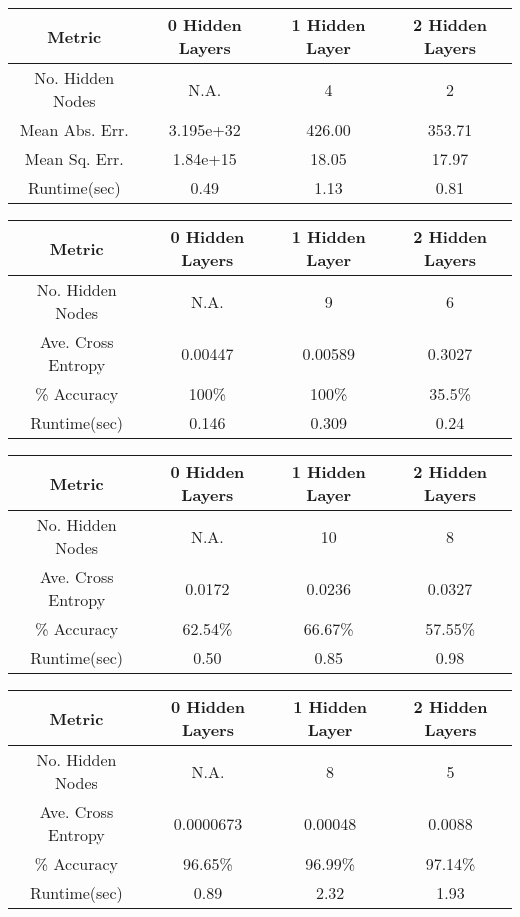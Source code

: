 \documentclass[twoside,11pt]{article}
\begin{document}
\begin{center}
	\begin{tabular}{|c c c c|}
		\hline
		Metric & 0 Hidden Layers & 1 Hidden Layer & 2 Hidden Layers \\ [0.5ex]
		\hline \hline
		No. Hidden Nodes & N.A. & 4 & 2 \\
		\hline
		Mean Abs. Err. & 3.195e+32 & 426.00 & 353.71 \\
		\hline
		Mean Sq. Err. & 1.84e+15 & 18.05 & 17.97 \\
		\hline
		Runtime(sec) & 0.49 & 1.13 &  0.81 \\
		\hline
	\end{tabular}
\end{center}


\begin{center}
	\begin{tabular}{|c c c c|}
		\hline
		Metric & 0 Hidden Layers & 1 Hidden Layer & 2 Hidden Layers \\ [0.5ex]
		\hline \hline
		No. Hidden Nodes & N.A. & 9 & 6 \\
		\hline
		Ave. Cross Entropy & 0.00447 & 0.00589 & 0.3027 \\
		\hline
		\% Accuracy & 100\% & 100\% & 35.5\% \\
		\hline
		Runtime(sec) & 0.146 & 0.309 & 0.24 \\
		\hline
	\end{tabular}
\end{center}


\begin{center}
	\begin{tabular}{|c c c c|}
		\hline
		Metric & 0 Hidden Layers & 1 Hidden Layer & 2 Hidden Layers \\ [0.5ex]
		\hline \hline
		No. Hidden Nodes & N.A. & 10 & 8 \\
		\hline
		Ave. Cross Entropy & 0.0172 & 0.0236 & 0.0327 \\
		\hline
		\% Accuracy & 62.54\% & 66.67\% & 57.55\% \\
		\hline
		Runtime(sec) & 0.50 & 0.85 & 0.98 \\
		\hline
	\end{tabular}
\end{center}

\begin{center}
	\begin{tabular}{|c c c c|}
		\hline
		Metric & 0 Hidden Layers & 1 Hidden Layer & 2 Hidden Layers \\ [0.5ex]
		\hline \hline
		No. Hidden Nodes & N.A. & 8 & 5 \\
		\hline
		Ave. Cross Entropy & 0.0000673 & 0.00048 & 0.0088 \\
		\hline
		\% Accuracy & 96.65\% & 96.99\% & 97.14\% \\
		\hline
		Runtime(sec) & 0.89 & 2.32 & 1.93 \\
		\hline
	\end{tabular}
\end{center}
\end{document}

